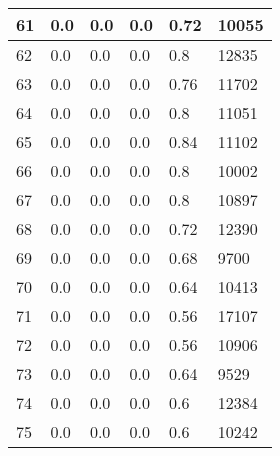 \begin{longtable}{|l|l|l|l|l|l|}
61 & 0.0 & 0.0 & 0.0 & 0.72 & 10055 \\ \hline 
62 & 0.0 & 0.0 & 0.0 & 0.8 & 12835 \\ \hline 
63 & 0.0 & 0.0 & 0.0 & 0.76 & 11702 \\ \hline 
64 & 0.0 & 0.0 & 0.0 & 0.8 & 11051 \\ \hline 
65 & 0.0 & 0.0 & 0.0 & 0.84 & 11102 \\ \hline 
66 & 0.0 & 0.0 & 0.0 & 0.8 & 10002 \\ \hline 
67 & 0.0 & 0.0 & 0.0 & 0.8 & 10897 \\ \hline 
68 & 0.0 & 0.0 & 0.0 & 0.72 & 12390 \\ \hline 
69 & 0.0 & 0.0 & 0.0 & 0.68 & 9700 \\ \hline 
70 & 0.0 & 0.0 & 0.0 & 0.64 & 10413 \\ \hline 
71 & 0.0 & 0.0 & 0.0 & 0.56 & 17107 \\ \hline 
72 & 0.0 & 0.0 & 0.0 & 0.56 & 10906 \\ \hline 
73 & 0.0 & 0.0 & 0.0 & 0.64 & 9529 \\ \hline 
74 & 0.0 & 0.0 & 0.0 & 0.6 & 12384 \\ \hline 
75 & 0.0 & 0.0 & 0.0 & 0.6 & 10242 \\ \hline 
\end{longtable}